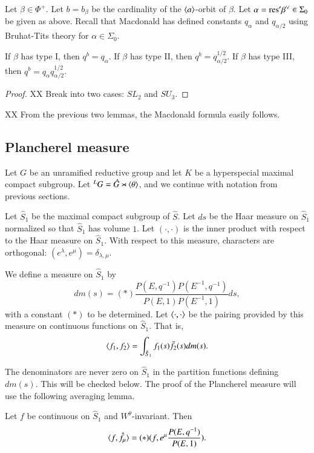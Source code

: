 Let $\beta\in \Phi^+$.  
Let $b=b_\beta$ be the cardinality of the $\langle{a}\rangle$-orbit of $\beta$.
Let $\alpha = {\operatorname{res}}'\beta^\vee\in\Sigma_0$ be given as above.
Recall that Macdonald has defined constants $q_\alpha$ and $q_{\alpha/2}$ using Bruhat-Tits theory for $\alpha\in \Sigma_0$.

\begin{lemma}  
If $\beta$ has type I, then $q^b = q_\alpha$.  If $\beta$ has type II, then $q^b = q_{\alpha/2}^{1/2}$.  If $\beta$ has
type III, then $q^b = q_{\alpha} q_{\alpha/2}^{1/2}$.  
\end{lemma}

\begin{proof}
XX Break into two cases: $SL_2$ and $SU_3$.
\end{proof}

XX From the previous two lemmas, the Macdonald formula easily follows.

\subsection{Plancherel measure}

Let $G$ be an unramified reductive group and let $K$ be a hyperspecial maximal compact subgroup.
Let ${}^LG = \hat G\rtimes \langle{\theta}\rangle$, and we continue with notation from previous sections.

Let $\hat S_1$ be the maximal compact subgroup of $\hat S$.  Let $ds$ be the Haar measure on $\hat S_1$ normalized
so that $\hat S_1$ has volume $1$.
Let $(\cdot,\cdot)$ is the inner product with respect to the Haar  measure on $\hat S_1$.
With respect to this measure, characters are orthogonal: $(e^\lambda,e^\mu) = \delta_{\lambda,\mu}$.  


We define a measure on $\hat S_1$ by
\[
dm(s) = (*)\frac{P(E,q^{-1}) P(E^{-1},q^{-1})}{P(E,1) P(E^{-1},1)} ds,
\]
with a constant $(*)$ to be determined.
Let $\langle{\cdot,\cdot}\rangle$ be the pairing provided by this measure on continuous functions on $\hat S_1$.
That is, 
\[
\langle{f_1,f_2}\rangle = \int_{\hat S_1} f_1(s) \bar f_2(s) dm(s).
\]

The denominators are never zero on $\hat S_1$ in the partition functions defining 
$dm(s)$.  This will be checked below.
The proof of the Plancherel measure will use the following averaging lemma.

\begin{lemma}\label{lemma:average} 
Let $f$ be continuous on $\hat S_1$ and $W^\theta$-invariant.
Then
\[
\langle{f,\hat f_\mu}\rangle = (*) (f, e^\mu\frac{ P(E,q^{-1})}{P(E,1)}).
\]
\end{lemma}

